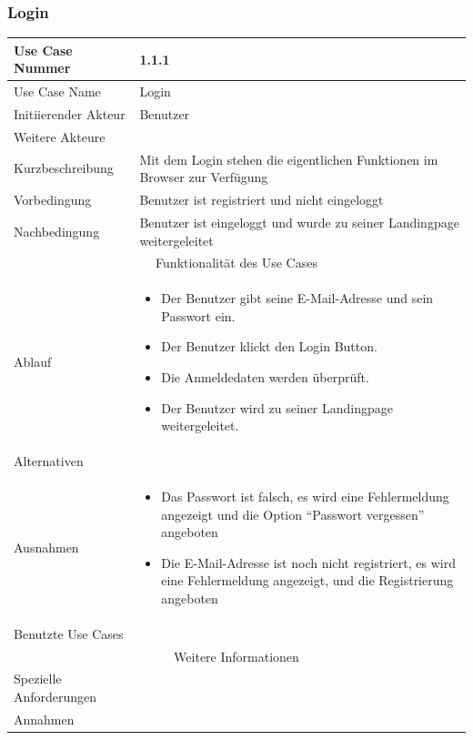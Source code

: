\documentclass[10pt,a4paper]{article}
\begin{document}
\subsubsection{Login}
	\begin{tabular}{|l|p{.5\linewidth}|}
	\hline Use Case Nummer & 1.1.1 \\ 
	\hline Use Case Name & Login \\ 
	\hline Initiierender Akteur & Benutzer \\
	\hline Weitere Akteure & \\
	\hline Kurzbeschreibung & Mit dem Login stehen die eigentlichen Funktionen im Browser zur Verf\"ugung \\
	\hline Vorbedingung & Benutzer ist registriert und nicht eingeloggt \\
	\hline Nachbedingung & Benutzer ist eingeloggt und wurde zu seiner Landingpage weitergeleitet \\
	\hline \multicolumn{2}{|c|}{Funktionalität des Use Cases}\\
	\hline Ablauf & \begin{itemize}
		\item Der Benutzer gibt seine E-Mail-Adresse und sein Passwort ein.
		\item Der Benutzer klickt den Login Button.
                \item Die Anmeldedaten werden überprüft.
                \item Der Benutzer wird zu seiner Landingpage weitergeleitet.
	\end{itemize} \\
	\hline Alternativen &  \\
	\hline Ausnahmen & \begin{itemize}
		\item Das Passwort ist falsch, es wird eine Fehlermeldung angezeigt und die Option ``Passwort vergessen'' angeboten
		\item Die E-Mail-Adresse ist noch nicht registriert, es wird eine Fehlermeldung angezeigt, und die Registrierung angeboten
	\end{itemize} \\
	\hline Benutzte Use Cases &  \\
	\hline \multicolumn{2}{|c|}{Weitere Informationen} \\
	\hline Spezielle Anforderungen &  \\
	\hline Annahmen &  \\
	\hline
	\end{tabular}
			 
\end{document}

